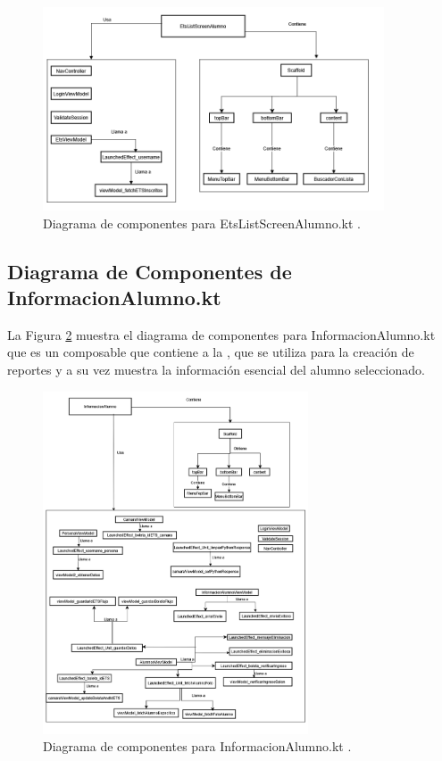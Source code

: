 \begin{figure}[htbp!]
	\begin{center}
		\includegraphics[width=0.9\textwidth]{DiagramasMoviles/DCM (23)}
		\caption{Diagrama de componentes para EtsListScreenAlumno.kt .}
		\label{fig:Componentes_10}
	\end{center}
\end{figure}

\newpage

\subsection{Diagrama de Componentes de InformacionAlumno.kt}

La Figura \ref{fig:Componentes_11} muestra el diagrama de componentes para InformacionAlumno.kt que es un composable que contiene a la , que se utiliza para la creación de reportes y a su vez muestra la información esencial del alumno seleccionado.

\begin{figure}[htbp!]
	\begin{center}
		\includegraphics[width=0.7\textwidth]{DiagramasMoviles/DCM (24)}
		\caption{Diagrama de componentes para InformacionAlumno.kt .}
		\label{fig:Componentes_11}
	\end{center}
\end{figure}

